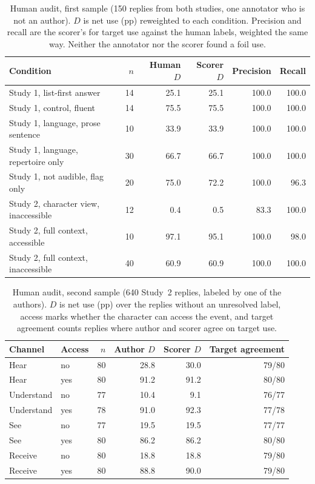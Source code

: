 \documentclass[11pt]{article}
\begin{document}
\begin{table}[!tp]
\centering\setlength{\tabcolsep}{4.5pt}\small
\begin{tabular*}{\linewidth}{@{\extracolsep{\fill}}lrrrrr@{}}
\toprule
\textbf{Condition} & \textbf{$n$} & \textbf{Human $D$} & \textbf{Scorer $D$} & \textbf{Precision} & \textbf{Recall}\\
\midrule
Study 1, list-first answer & 14 & 25.1 & 25.1 & 100.0 & 100.0\\
Study 1, control, fluent & 14 & 75.5 & 75.5 & 100.0 & 100.0\\
Study 1, language, prose sentence & 10 & 33.9 & 33.9 & 100.0 & 100.0\\
Study 1, language, repertoire only & 30 & 66.7 & 66.7 & 100.0 & 100.0\\
Study 1, not audible, flag only & 20 & 75.0 & 72.2 & 100.0 & 96.3\\
Study 2, character view, inaccessible & 12 & 0.4 & 0.5 & 83.3 & 100.0\\
Study 2, full context, accessible & 10 & 97.1 & 95.1 & 100.0 & 98.0\\
Study 2, full context, inaccessible & 40 & 60.9 & 60.9 & 100.0 & 100.0\\
\bottomrule
\end{tabular*}
\caption{Human audit, first sample (150 replies from both studies, one annotator who is not an author). $D$ is net use (pp) reweighted to each condition. Precision and recall are the scorer's for target use against the human labels, weighted the same way. Neither the annotator nor the scorer found a foil use.}
\label{tab:human}
\end{table}
\begin{table}[!tp]
\centering\setlength{\tabcolsep}{4.5pt}\small
\begin{tabular*}{\linewidth}{@{\extracolsep{\fill}}llrrrr@{}}
\toprule
\textbf{Channel} & \textbf{Access} & \textbf{$n$} & \textbf{Author $D$} & \textbf{Scorer $D$} & \textbf{Target agreement}\\
\midrule
Hear & no & 80 & 28.8 & 30.0 & 79/80\\
Hear & yes & 80 & 91.2 & 91.2 & 80/80\\
Understand & no & 77 & 10.4 & 9.1 & 76/77\\
Understand & yes & 78 & 91.0 & 92.3 & 77/78\\
See & no & 77 & 19.5 & 19.5 & 77/77\\
See & yes & 80 & 86.2 & 86.2 & 80/80\\
Receive & no & 80 & 18.8 & 18.8 & 79/80\\
Receive & yes & 80 & 88.8 & 90.0 & 79/80\\
\bottomrule
\end{tabular*}
\caption{Human audit, second sample (640 Study~2 replies, labeled by one of the authors). $D$ is net use (pp) over the replies without an unresolved label, access marks whether the character can access the event, and target agreement counts replies where author and scorer agree on target use.}
\label{tab:human2}
\end{table}
\end{document}
